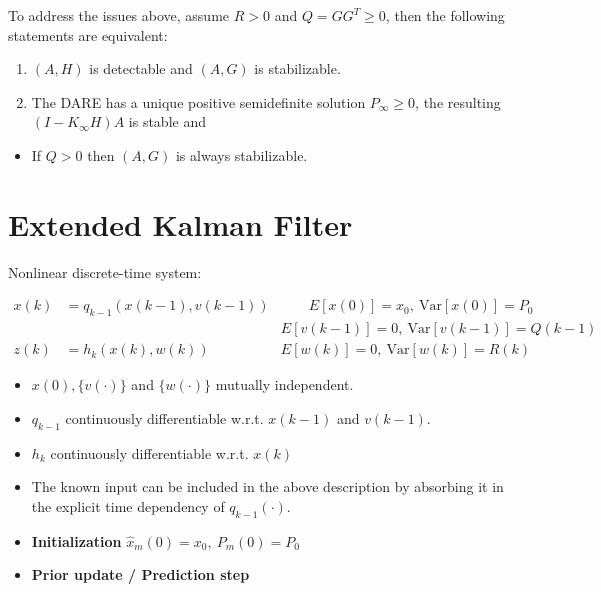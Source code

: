 \documentclass[10pt,a4paper]{scrartcl}
\begin{document}
\begin{multicols*}{2}
\begin{multicols*}{3}
To address the issues above, assume $R>0$ and $Q = GG^T\geq 0$, then the following statements are equivalent:

\begin{enumerate}
\item $(A,H)$ is detectable and $(A,G)$ is stabilizable.
\item The DARE has a unique positive semidefinite solution $P_\infty\geq 0$, the resulting $(I-K_\infty H)A$ is stable and

\end{enumerate}

\begin{itemize}
\item If $Q>0$ then $(A,G)$ is always stabilizable.
\end{itemize}

\section{Extended Kalman Filter}
\label{sec:EKF}

Nonlinear discrete-time system:

\begin{align*}
x(k)&=q_{k-1}(x(k-1),v(k-1))&\qquad E[x(0)]=x_0,\ \text{Var}[x(0)]=P_0\\
&&E[v(k-1)]=0,\ \text{Var}[v(k-1)]=Q(k-1)\\
z(k)&=h_k(x(k),w(k))&E[w(k)]=0,\ \text{Var}[w(k)]=R(k)
\end{align*}

\begin{itemize}
\item $x(0), \{v(\cdot)\}$ and $\{w(\cdot)\}$ mutually independent.
\item $q_{k-1}$ continuously differentiable w.r.t. $x(k-1)$ and $v(k-1)$.
\item $h_k$ continuously differentiable w.r.t. $x(k)$
\item The known input can be included in the above description by absorbing it in the explicit time dependency of $q_{k-1}(\cdot)$.
\end{itemize}

\begin{itemize}
\item \textbf{Initialization} $\hat{x}_m(0)=x_0,\ P_m(0)=P_0$
\item \textbf{Prior update / Prediction step}


\end{itemize}
\end{multicols*}
\end{multicols*}
\end{document}

